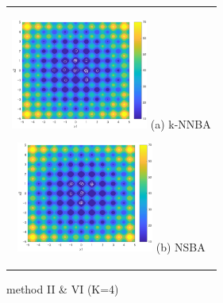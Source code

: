 \documentclass{ies2018}
\begin{document}
\begin{figure}[p]
\begin{center}
\begin{tabular}{c}
\begin{minipage}{0.5\hsize}
  \begin{center}
   \includegraphics[width=45mm]{eps/ii_k=4_1000.eps}
   \hspace{1.0cm} (a) k-NNBA
  \end{center}
  \label{fig:k=4_ii}
 \end{minipage}

 \begin{minipage}{0.5\hsize}
  \begin{center}
   \includegraphics[width=45mm]{eps/vi_k=4_1000.eps}
   \hspace{1.0cm} (b) NSBA
  \end{center}
  \label{fig:k=4_vi}
 \end{minipage}
\end{tabular}
\end{center}
\caption{method II \& VI (K=4)}
\label{fig:1000_26}
\end{figure}
\end{document}
